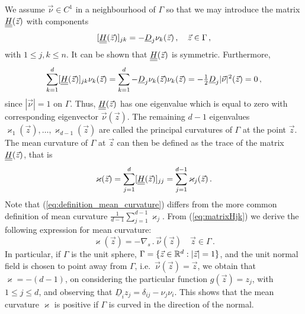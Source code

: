 We assume $\vec \nu \in C^1$ in a neighbourhood of $\Gamma$ so that we
may introduce the matrix $\mat H(\vec z)$ with components
\begin{equation}\label{eq:matrixHjk}
[\mat H (\vec z)]_{jk} = - \underline{D}_j \nu_k (\vec z)\,, \quad \vec z \in
\Gamma \, ,
\end{equation}
with $1\leq j,k\leq n$. It can be shown that $\mat H(\vec z)$ is symmetric.
Furthermore,
\begin{equation}
\sum_{k = 1}^d [\mat H(\vec z)]_{jk} \nu_k (\vec z) =
\sum_{k = 1}^d - \underline{D}_j \nu_k (\vec z) \nu_k (\vec z) =
- \tfrac{1}{2} \underline{D}_j |\vec \nu|^2 (\vec z) = 0 \, ,
\end{equation}
since $|\vec \nu| = 1$ on $\Gamma$. Thus, $\mat H(\vec z)$ has one
eigenvalue which is equal to zero with corresponding eigenvector
$\vec\nu(\vec z)$. The remaining $d - 1$ eigenvalues $\varkappa_1 (\vec z),
\hdots, \varkappa_{d - 1} (\vec z)$ are called the principal curvatures of
$\Gamma$ at the point $\vec z$. The mean curvature of $\Gamma$ at $\vec z$
can then be defined as the trace of the matrix $\mat H(\vec z)$, that is
\begin{equation}\label{eq:definition_mean_curvature}
\varkappa (\vec z) = \sum_{j = 1}^d [\mat H(\vec z)]_{jj} = \sum_{j = 1}^{d -
1} \varkappa_j (\vec z) \,.
\end{equation}
Note that (\ref{eq:definition_mean_curvature}) differs from the more common
definition of mean curvature $\frac{1}{d - 1} \sum_{j = 1}^{d - 1} \varkappa_j$.
From (\ref{eq:matrixHjk}) we derive the following expression for mean
curvature:
\begin{equation}
\varkappa (\vec z)=-\nabla_s \,.\, \vec \nu(\vec z) \quad \vec z \in \Gamma\,.
\end{equation}
In particular, if $\Gamma$ is the unit sphere,
$\Gamma = \{ \vec z \in \mathbb R^d : |\vec z| = 1 \}$,
and the unit normal field is chosen to point away from $\Gamma$,
i.e.~$\vec\nu(\vec z) = \vec z$, we obtain that $\varkappa = -
(d - 1)$, on considering the particular function $g(\vec z) = z_j$, with
$1 \leq j \leq d$, and observing that $\underline{D}_i z_j = \delta_{ij} - \nu_j
\nu_i$. This shows that the mean curvature $\varkappa$ is positive if $\Gamma$
is curved in the direction of the normal.

